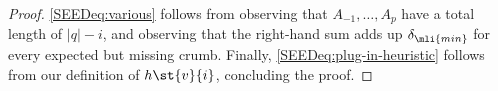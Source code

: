 \begin{proof}
	\cref{SEEDeq:various} follows from observing that $A_{-1}, \dots, A_p$ have a
	total length of $|q|-i$, and observing that the right-hand sum adds up
	$\delta_{\mli{min}}$ for every expected but missing crumb.
	Finally, \cref{SEEDeq:plug-in-heuristic} follows from our definition of
	$h\st{v}{i}$, concluding the proof.
\end{proof}
